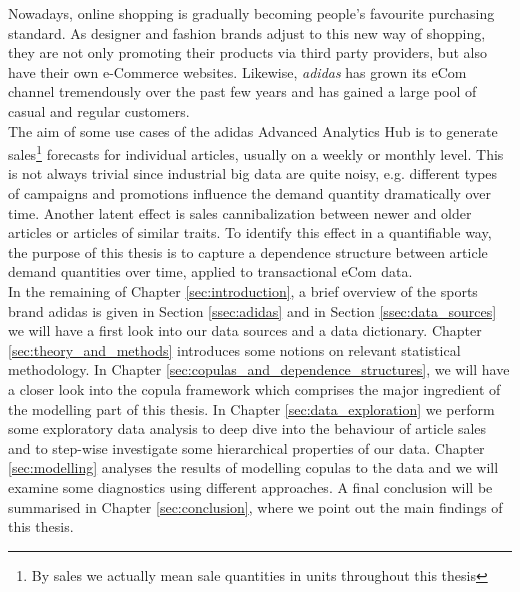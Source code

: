 

Nowadays, online shopping is gradually becoming people's favourite purchasing standard. As designer and fashion brands adjust to this new way of shopping, they are not only promoting their products via third party 	providers, but also have their own e-Commerce websites. Likewise, \textit{adidas} has grown its eCom channel tremendously over the past few years and has gained a large pool of casual and regular customers.\\

The aim of some use cases of the adidas Advanced Analytics Hub is to generate sales\footnote{By sales we actually mean sale quantities in units throughout this thesis} forecasts for individual articles, usually on a weekly or monthly level. This is not always trivial since industrial big data are quite noisy, e.g. different types of campaigns and promotions influence the demand quantity dramatically over time. Another latent effect is sales cannibalization between newer and older articles or articles of similar traits. To identify this effect in a quantifiable way, the purpose of this thesis is to capture a dependence structure between article demand quantities over time, applied to transactional eCom data. \\

In the remaining of Chapter \ref{sec:introduction}, a brief overview of the sports brand adidas is given in Section \ref{ssec:adidas} and in Section \ref{ssec:data_sources} we will have a first look into our data sources and a data dictionary. Chapter \ref{sec:theory_and_methods} introduces some notions on relevant statistical methodology. In Chapter \ref{sec:copulas_and_dependence_structures}, we will have a closer look into the copula framework which comprises the major ingredient of the modelling part of this thesis. In Chapter \ref{sec:data_exploration} we perform some exploratory data analysis to deep dive into the behaviour of article sales and to step-wise investigate some hierarchical properties of our data.  Chapter \ref{sec:modelling} analyses the results of modelling copulas to the data and we will examine some diagnostics using different approaches. A final conclusion will be summarised in Chapter \ref{sec:conclusion}, where we point out the main findings of this thesis.




